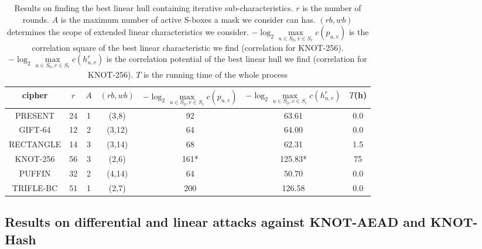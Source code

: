 \begin{table}
	\caption{Results on finding the best linear hull containing iterative sub-characteristics. $r$ is the number of rounds. $A$ is the maximum number of active S-boxes a mask we consider can has. $(rb,wb)$ determines the scope of extended linear characteristics we consider. $-\log_2\max\limits_{u\in S_0,v\in S_r}c(p_{u,v})$ is the correlation square of the best linear characteristic we find (correlation for KNOT-256). $-\log_2\max\limits_{u\in S_0,v\in S_r}c(h^r_{u,v})$ is the correlation potential of the best linear hull we find (correlation for KNOT-256). $T$ is the running time of the whole process}\label{tab:ELP}
	\centering
	\begin{tabular}{|c|c|c|c|c|c|c|}
		\hline
		cipher & $r$ & $A$ & $(rb,wb)$ & $-\log_2\max\limits_{u\in S_0,v\in S_r}c(p_{u,v})$ & $-\log_2\max\limits_{u\in S_0,v\in S_r}c(h^r_{u,v})$ & $T$(h) \\
		\hline
		PRESENT & 24 & 1 & (3,8) & 92 & 63.61 & 0.0 \\
		\hline
		GIFT-64 & 12 & 2 & (3,12) & 64 & 64.00 & 0.0 \\
		\hline 
		RECTANGLE & 14 & 3 & (3,14) & 68 & 62.31 & 1.5 \\
		\hline
		KNOT-256 & 56 & 3 & (2,6) & 161* & 125.83* & 75 \\%
		\hline
		PUFFIN & 32 & 2 & (4,14) & 64 & 50.70 & 0.0 \\
		\hline
		TRIFLE-BC & 51 & 1 & (2,7) & 200 & 126.58 & 0.0 \\
		\hline
	\end{tabular}
\end{table}



\subsection{Results on differential and linear attacks against KNOT-AEAD and KNOT-Hash}

